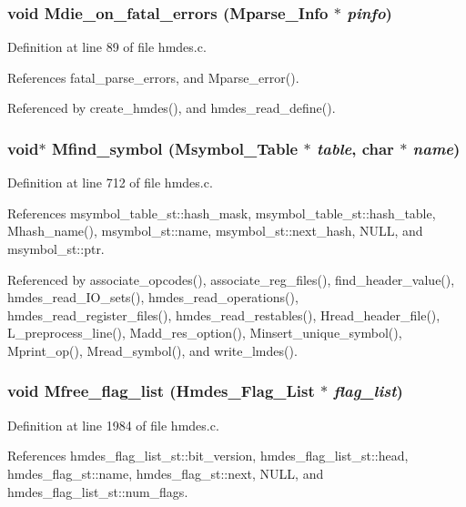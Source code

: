 \subsubsection{\setlength{\rightskip}{0pt plus 5cm}void Mdie\_\-on\_\-fatal\_\-errors (\bf{Mparse\_\-Info} $\ast$ {\em pinfo})}\label{hmdes_8c_c86bbf19bc7a087f23ce6dabbcc0ba13}




Definition at line 89 of file hmdes.c.

References fatal\_\-parse\_\-errors, and Mparse\_\-error().

Referenced by create\_\-hmdes(), and hmdes\_\-read\_\-define().
\subsubsection{\setlength{\rightskip}{0pt plus 5cm}void$\ast$ Mfind\_\-symbol (\bf{Msymbol\_\-Table} $\ast$ {\em table}, char $\ast$ {\em name})}\label{hmdes_8c_6bcfff652cd0e21dc304d3b05c230a52}




Definition at line 712 of file hmdes.c.

References msymbol\_\-table\_\-st::hash\_\-mask, msymbol\_\-table\_\-st::hash\_\-table, Mhash\_\-name(), msymbol\_\-st::name, msymbol\_\-st::next\_\-hash, NULL, and msymbol\_\-st::ptr.

Referenced by associate\_\-opcodes(), associate\_\-reg\_\-files(), find\_\-header\_\-value(), hmdes\_\-read\_\-IO\_\-sets(), hmdes\_\-read\_\-operations(), hmdes\_\-read\_\-register\_\-files(), hmdes\_\-read\_\-restables(), Hread\_\-header\_\-file(), L\_\-preprocess\_\-line(), Madd\_\-res\_\-option(), Minsert\_\-unique\_\-symbol(), Mprint\_\-op(), Mread\_\-symbol(), and write\_\-lmdes().
\subsubsection{\setlength{\rightskip}{0pt plus 5cm}void Mfree\_\-flag\_\-list (\bf{Hmdes\_\-Flag\_\-List} $\ast$ {\em flag\_\-list})}\label{hmdes_8c_a12ab0bf2d586730b3c3248f688921af}




Definition at line 1984 of file hmdes.c.

References hmdes\_\-flag\_\-list\_\-st::bit\_\-version, hmdes\_\-flag\_\-list\_\-st::head, hmdes\_\-flag\_\-st::name, hmdes\_\-flag\_\-st::next, NULL, and hmdes\_\-flag\_\-list\_\-st::num\_\-flags.

